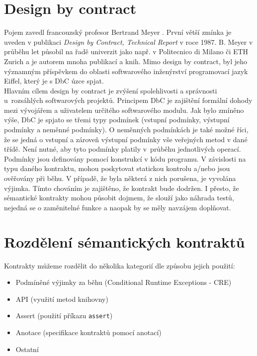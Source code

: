 	\section{Design by contract}
		Pojem  zavedl francouzský profesor Bertrand Meyer \cite{meyerBio}\cite{eiffelStudio}. První větší zmínka je uveden v publikaci \emph{Design by Contract, Technical Report} v roce 1987. B. Meyer v průběhu let působil na řadě univerzit jako např. v Politecnico di Milano či ETH Zurich a je autorem mnoha publikací a knih. Mimo design by contract, byl jeho významným příspěvkem do oblasti softwarového inženýrství programovací jazyk Eiffel, který je s DbC úzce spjat.\\	
	
		Hlavním cílem design by contract je zvýšení spolehlivosti a správnosti u~rozsáhlých softwarových projektů. Principem DbC je zajištění formální dohody mezi vývojářem a uživatelem určitého softwarového modulu. Jak bylo zmíněno výše, DbC je spjato se třemi typy podmínek (vstupní podmínky, výstupní podmínky a neměnné podmínky). O neměnných podmínkách je také možné říci, že se jedná o vstupní a zároveň výstupní podmínky vše veřejných metod v dané třídě. Není nutné, aby tyto podmínky platily v~průběhu jednotlivých operací.\\
	
	Podmínky jsou definovány pomocí konstrukcí v kódu programu. V závislosti na typu daného kontraktu, mohou poskytovat statickou kontrolu a/nebo jsou ověřovány při běhu. V případě, že byla některá z nich porušena, je vyvolána výjimka. Tímto chováním je zajištěno, že kontrakt bude dodržen. I přesto, že sémantické kontrakty mohou působit dojmem, že slouží jako náhrada testů, nejedná se o zaměnitelné funkce a naopak by se měly navzájem doplňovat.	
	
	
	\section{Rozdělení sémantických kontraktů}
		Kontrakty můžeme rozdělit do několika kategorií dle způsobu jejich použití:
			
		\begin{itemize}
			\item Podmíněné výjimky za běhu (Conditional Runtime Exceptions - CRE)
			\item API (využití metod knihovny)
			\item Assert (použití příkazu \texttt{assert})
			\item Anotace (specifikace kontraktů pomocí anotací)
			\item Ostatní
		\end{itemize}				
		
